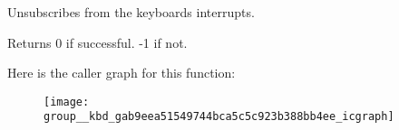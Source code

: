 Unsubscribes from the keyboard\textquotesingle{}s interrupts. 

\begin{DoxyReturn}{Returns}
0 if successful. -\/1 if not. 
\end{DoxyReturn}


Here is the caller graph for this function\+:\nopagebreak
\begin{figure}[H]
\begin{center}
\leavevmode
\texttt{[image: group\_\_kbd\_gab9eea51549744bca5c5c923b388bb4ee\_icgraph]}
\end{center}
\end{figure}


